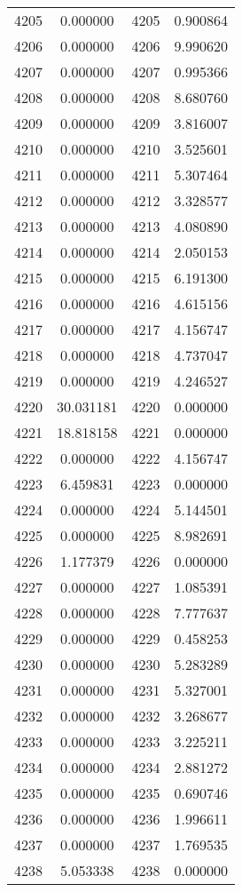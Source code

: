 \documentclass[12pt]{article}
\begin{document}
\begin{longtable}{@{}cccc@{}}
4205 & 0.000000 & 4205 & 0.900864 \\
4206 & 0.000000 & 4206 & 9.990620 \\
4207 & 0.000000 & 4207 & 0.995366 \\
4208 & 0.000000 & 4208 & 8.680760 \\
4209 & 0.000000 & 4209 & 3.816007 \\
4210 & 0.000000 & 4210 & 3.525601 \\
4211 & 0.000000 & 4211 & 5.307464 \\
4212 & 0.000000 & 4212 & 3.328577 \\
4213 & 0.000000 & 4213 & 4.080890 \\
4214 & 0.000000 & 4214 & 2.050153 \\
4215 & 0.000000 & 4215 & 6.191300 \\
4216 & 0.000000 & 4216 & 4.615156 \\
4217 & 0.000000 & 4217 & 4.156747 \\
4218 & 0.000000 & 4218 & 4.737047 \\
4219 & 0.000000 & 4219 & 4.246527 \\
4220 & 30.031181 & 4220 & 0.000000 \\
4221 & 18.818158 & 4221 & 0.000000 \\
4222 & 0.000000 & 4222 & 4.156747 \\
4223 & 6.459831 & 4223 & 0.000000 \\
4224 & 0.000000 & 4224 & 5.144501 \\
4225 & 0.000000 & 4225 & 8.982691 \\
4226 & 1.177379 & 4226 & 0.000000 \\
4227 & 0.000000 & 4227 & 1.085391 \\
4228 & 0.000000 & 4228 & 7.777637 \\
4229 & 0.000000 & 4229 & 0.458253 \\
4230 & 0.000000 & 4230 & 5.283289 \\
4231 & 0.000000 & 4231 & 5.327001 \\
4232 & 0.000000 & 4232 & 3.268677 \\
4233 & 0.000000 & 4233 & 3.225211 \\
4234 & 0.000000 & 4234 & 2.881272 \\
4235 & 0.000000 & 4235 & 0.690746 \\
4236 & 0.000000 & 4236 & 1.996611 \\
4237 & 0.000000 & 4237 & 1.769535 \\
4238 & 5.053338 & 4238 & 0.000000 \\

\end{longtable}
\end{document}
